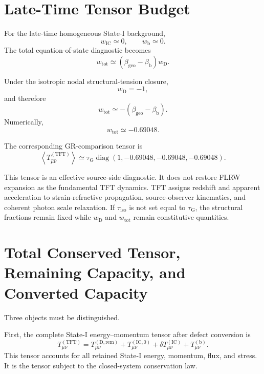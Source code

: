 \section{Late-Time Tensor Budget}

For the late-time homogeneous State-I background,
\begin{equation}
    w_{\mathrm{IC}}\simeq0, \qquad w_{\mathrm{b}}\simeq0.
\end{equation}
The total equation-of-state diagnostic becomes
\begin{equation}
    w_{\mathrm{tot}} \simeq \left( \beta_{\mathrm{geo}} - \beta_{\mathrm{b}} \right) w_{\mathrm{D}}.
\end{equation}

Under the isotropic nodal structural-tension closure,
\begin{equation}
    w_{\mathrm{D}}=-1,
\end{equation}
and therefore
\begin{equation}
    w_{\mathrm{tot}} \simeq -\left( \beta_{\mathrm{geo}} - \beta_{\mathrm{b}} \right).
\end{equation}
Numerically,
\begin{equation}
    w_{\mathrm{tot}}\simeq-0.69048.
\end{equation}

The corresponding GR-comparison tensor is
\begin{equation}
    \left\langle T_{\hat{\mu}\hat{\nu}}^{(\mathrm{TFT})} \right\rangle \simeq \tau_{\mathrm{G}} \operatorname{diag} \left( 1,-0.69048,-0.69048,-0.69048 \right).
\end{equation}

This tensor is an effective source-side diagnostic. It does not restore FLRW expansion as the fundamental TFT dynamics. TFT assigns redshift and apparent acceleration to strain-refractive propagation, source-observer kinematics, and coherent photon scale relaxation. If $\tau_{\mathrm{iso}}$ is not set equal to $\tau_{\mathrm{G}}$, the structural fractions remain fixed while $w_{\mathrm{D}}$ and $w_{\mathrm{tot}}$ remain constitutive quantities.

\section{Total Conserved Tensor, Remaining Capacity, and Converted Capacity}

Three objects must be distinguished.

First, the complete State-I energy--momentum tensor after defect conversion is
\begin{equation}
    T_{\mu\nu}^{(\mathrm{TFT})} = T_{\mu\nu}^{(\mathrm{D},\mathrm{rem})} + T_{\mu\nu}^{(\mathrm{IC},0)} + \delta T_{\mu\nu}^{(\mathrm{IC})} + T_{\mu\nu}^{(\mathrm{b})}.
\end{equation}
This tensor accounts for all retained State-I energy, momentum, flux, and stress. It is the tensor subject to the closed-system conservation law.

